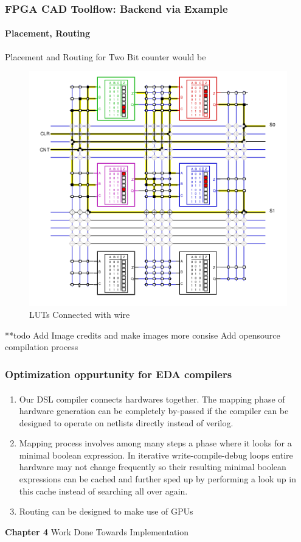 \documentclass{beamer}
\begin{document}
\begin{frame}[fragile]
  \frametitle{FPGA CAD Toolflow: Backend via Example}
  \framesubtitle{Placement, Routing}

  Placement and Routing for Two Bit counter would be 

  \begin{figure}
    \centering
    \includegraphics[width=0.5\linewidth]{images/fpga_luts.png}
    \caption{LUTs Connected with wire  }
    \label{exa_interconnect}
  \end{figure}
  **todo Add Image credits and make images more consise 
  Add opensource compilation process 
\end{frame}

\begin{frame}[fragile]
  \frametitle{Optimization oppurtunity for EDA compilers}
  \framesubtitle{}
  \begin{enumerate}
    \item Our DSL compiler connects hardwares together. The mapping phase
      of hardware generation can be completely by-passed if the compiler can
      be designed to operate on netlists directly instead of verilog.
    \item Mapping process involves among many steps a phase where it looks
      for a minimal boolean expression. In iterative write-compile-debug loops
      entire hardware may not change frequently so their resulting minimal
      boolean expressions can be cached and further sped up by performing a
      look up in this cache instead of searching all over again.
    \item Routing can be designed to make use of GPUs 
  \end{enumerate}
\end{frame}

\begin{frame}[c,fragile]

  \centering
  \textbf{Chapter 4}
  Work Done Towards Implementation
\end{frame}
\end{document}
